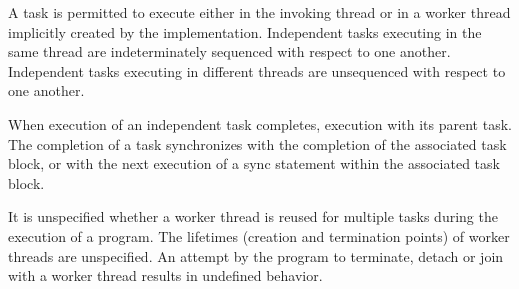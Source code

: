 
\pnum
A task is permitted to execute
either in the invoking thread
or in a worker thread implicitly created by the implementation.
Independent tasks executing in the same thread
are indeterminately sequenced with respect to one another.
Independent tasks executing in different threads
are unsequenced with respect to one another.

\pnum
When execution of an independent task completes,
execution
with its parent task.
The completion of a task synchronizes
with the completion of the associated task block,
or with the next execution of a sync statement
within the associated task block.

\pnum
It is unspecified whether a worker thread is reused
for multiple tasks
during the execution of a program.
The lifetimes (creation and termination points)
of worker threads are unspecified.
An attempt by the program
to terminate, detach or join with 
a worker thread
results in undefined behavior.

